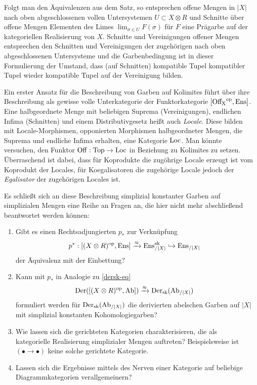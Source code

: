 \begin{bem}
  Folgt man den Äquivalenzen aus dem Satz, so entsprechen offene
  Mengen in $|X|$ nach oben abgeschlossenen vollen Untersystemen $U
  \subset X \otimes R$ und Schnitte über offene Mengen Elementen des
  Limes $\lim_{\sigma \in U} F(\sigma)$ für $F$ eine Prägarbe auf der
  kategoriellen Realisierung von $X$. Schnitte und Vereinigungen
  offener Mengen entsprechen den Schnitten und Vereinigungen der
  zugehörigen nach oben abgeschlossenen Untersysteme und die
  Garbenbedingung ist in dieser Formulierung der Umstand, dass (auf
  Schnitten) kompatible Tupel kompatibler Tupel wieder kompatible
  Tupel auf der Vereinigung bilden.
\end{bem}
\begin{bem}
  Ein erster Ansatz für die Beschreibung von Garben auf Kolimites
  führt über ihre Beschreibung als gewisse volle Unterkategorie der
  Funktorkategorie $[\operatorname{Off_X}^\mathrm{op}, \operatorname{Ens}]$. Eine halbgeordnete Menge mit
  beliebigen Suprema (Vereinigungen), endlichen Infima (Schnitten) und
  einem Distributivgesetz heißt auch \emph{Locale}. Diese bilden mit
  Locale-Morphismen, opponierten Morphismen halbgeordneter Mengen, die
  Suprema und endliche Infima erhalten, eine Kategorie $\operatorname{Loc}$. Man
  könnte versuchen, den Funktor $\operatorname{Off}: \operatorname{Top} \to \operatorname{Loc}$ in Beziehung zu
  Kolimites zu setzen. Überraschend ist dabei, dass für Koprodukte die
  zugöhrige Locale erzeugt ist vom Koprodukt der Locales, für
  Koegalisatoren die zugehörige Locale jedoch der \emph{Egalisator}
  der zugehörigen Locales ist.
\end{bem}

Es schließt sich an diese Beschreibung simplizial konstanter Garben
auf simplizialen Mengen eine Reihe an Fragen an, die hier nicht mehr
abschließend beantwortet werden können:
\begin{enumerate}
\item Gibt es einen Rechtsadjungierten $p_*$ zur Verknüpfung
  \[p^*: [(X \otimes R)^\mathrm{op}, \operatorname{Ens}] \xrightarrow{\approx} \operatorname{Ens}^{\operatorname{sk}}_{/|X|} \hookrightarrow \operatorname{Ens}_{/|X|} \]
  der Äquivalenz mit der Einbettung?
\item Kann mit $p_*$ in Analogie zu \ref{dersk-eq}
  \[ \operatorname{Der}([(X \otimes R)^\mathrm{op}, \operatorname{Ab}]) \xrightarrow{\approx} \operatorname{Der}_{\operatorname{sk}}(\operatorname{Ab}_{/|X|}) \]
  formuliert werden für $\operatorname{Der}_{\operatorname{sk}}(\operatorname{Ab}_{/|X|})$ die derivierten
  abelschen Garben auf $|X|$ mit simplizial konstanten
  Kohomologiegarben?
\item Wie lassen sich die gerichteten Kategorien charakterisieren, die
  als kategorielle Realisierung simplizialer Mengen auftreten?
  Beispielsweise ist $(\bullet \to \bullet)$ keine solche gerichtete
  Kategorie.
\item Lassen sich die Ergebnisse mittels des Nerven einer Kategorie
  auf beliebige Diagrammkategorien verallgemeinern?
\end{enumerate}

